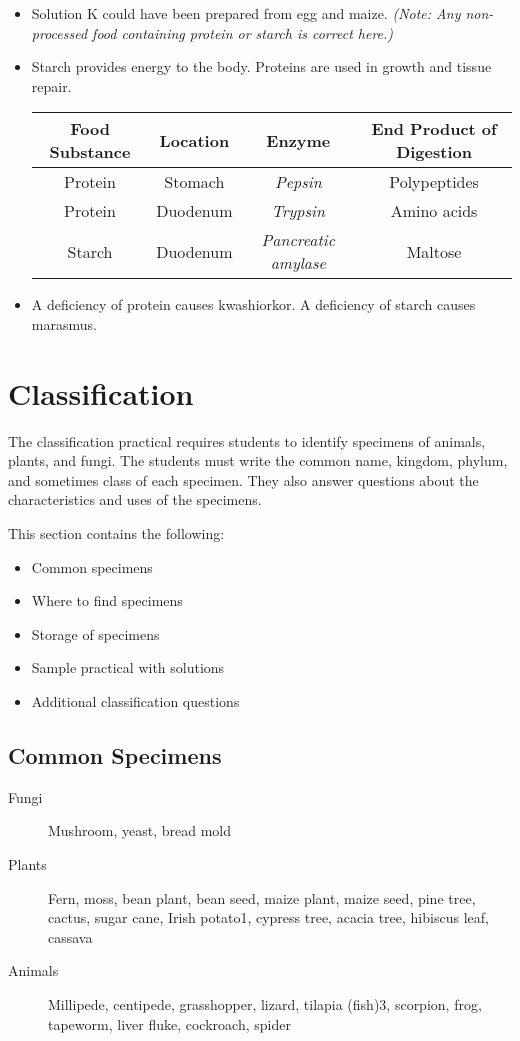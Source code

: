 \begin{itemize}
\item{Solution K could have been prepared from egg and maize. \textit{(Note: Any non-processed food containing protein or starch is correct here.)}}
\item{Starch provides energy to the body. Proteins are used in growth and tissue repair.}

\begin{center}
\begin{tabular}{| c | c | c | c |}
\hline
Food Substance & Location & Enzyme & End Product of Digestion\\ \hline
Protein & Stomach & \textit{Pepsin} & Polypeptides \\ \hline
Protein & Duodenum & \textit{Trypsin} & Amino acids \\ \hline
Starch & Duodenum & \textit{Pancreatic amylase} & Maltose \\ \hline
\hline
\end{tabular}
\end{center}

\item{A deficiency of protein causes kwashiorkor. A deficiency of starch causes marasmus.}
\end{itemize}

\section{Classification}

The classification practical requires students to identify specimens of animals, plants, and fungi. The students must write the common name, kingdom, phylum, and sometimes class of each specimen. They also answer questions about the characteristics and uses of the specimens.

This section contains the following:
\begin{itemize}
\item{Common specimens}
\item{Where to find specimens}
\item{Storage of specimens}
\item{Sample practical with solutions}
\item{Additional classification questions}
\end{itemize}

\subsection{Common Specimens}
\begin{description}
\item[Fungi]{Mushroom, yeast, bread mold}
\item[Plants]{Fern, moss, bean plant, bean seed, maize plant, maize seed, pine tree, cactus, sugar cane, Irish potato1, cypress tree, acacia tree, hibiscus leaf, cassava}
\item[Animals]{Millipede, centipede, grasshopper, lizard, tilapia (fish)3, scorpion, frog, tapeworm, liver fluke, cockroach, spider}
\end{description}

